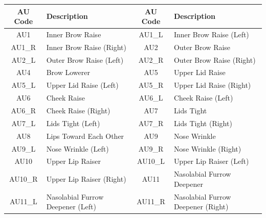 \documentclass[../../main]{subfiles}
\begin{document}
\begin{table}[h]
    \centering
    \scriptsize
    \begin{tabular}{|c|l|c|l|}
        \hline
        \textbf{AU Code} & \textbf{Description}                     & \textbf{AU Code} & \textbf{Description}                      \\ \hline
        AU1              & Inner Brow Raise                        & AU1\_L            & Inner Brow Raise (Left)                   \\ \hline
        AU1\_R           & Inner Brow Raise (Right)                & AU2              & Outer Brow Raise                          \\ \hline
        AU2\_L           & Outer Brow Raise (Left)                 & AU2\_R            & Outer Brow Raise (Right)                  \\ \hline
        AU4              & Brow Lowerer                            & AU5              & Upper Lid Raise                           \\ \hline
        AU5\_L           & Upper Lid Raise (Left)                  & AU5\_R            & Upper Lid Raise (Right)                   \\ \hline
        AU6              & Cheek Raise                             & AU6\_L            & Cheek Raise (Left)                        \\ \hline
        AU6\_R           & Cheek Raise (Right)                     & AU7              & Lids Tight                                \\ \hline
        AU7\_L           & Lids Tight (Left)                       & AU7\_R            & Lids Tight (Right)                        \\ \hline
        AU8              & Lips Toward Each Other                  & AU9              & Nose Wrinkle                              \\ \hline
        AU9\_L           & Nose Wrinkle (Left)                     & AU9\_R            & Nose Wrinkle (Right)                      \\ \hline
        AU10             & Upper Lip Raiser                        & AU10\_L           & Upper Lip Raiser (Left)                   \\ \hline
        AU10\_R          & Upper Lip Raiser (Right)                & AU11             & Nasolabial Furrow Deepener                \\ \hline
        AU11\_L          & Nasolabial Furrow Deepener (Left)       & AU11\_R           & Nasolabial Furrow Deepener (Right)        \\ \hline

\end{tabular}
\end{table}
\end{document}
